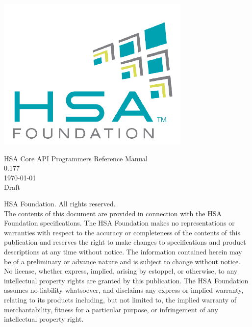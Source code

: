 \documentclass{book}
\begin{document}
\hypersetup{pageanchor=false,citecolor=blue}
\begin{titlepage}
\includegraphics[width=.5\textwidth]{fig/foundation.png}
\vspace*{7cm}
\begin{center}
{\Large HSA Core API Programmers Reference Manual\\[1ex]\large
0.177 }\\
\vspace*{1cm}
\vspace*{0.5cm}
{\small \today}\\
\vspace*{0.5cm}
{\small Draft}\\
\end{center}
\end{titlepage}
\thispagestyle{empty}
{ HSA Foundation. All rights reserved.\\}
The contents of this document are provided in connection with the
HSA Foundation specifications. The HSA Foundation makes no
representations or warranties with respect to the accuracy or
completeness of the contents of this publication and reserves the
right to make changes to specifications and product descriptions at
any time without notice. The information contained herein may be of
a preliminary or advance nature and is subject to change without
notice. No license, whether express, implied, arising by estoppel,
or otherwise, to any intellectual property rights are granted by
this publication. The HSA Foundation assumes no liability
whatsoever, and disclaims any express or implied warranty, relating
to its products including, but not limited to, the implied warranty
of merchantability, fitness for a particular purpose, or
infringement of any intellectual property right.
\clearpage
{}
\tableofcontents
{}
\clearpage

\setcounter{page}{1}
\end{document}
